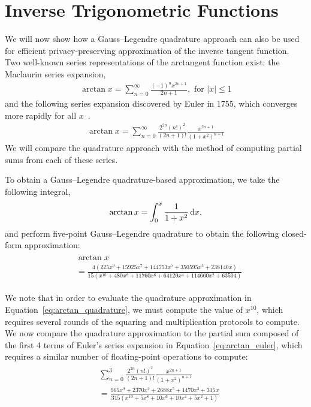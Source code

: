 \section{Inverse Trigonometric Functions}
We will now show how a Gauss--Legendre quadrature approach can also be used for efficient privacy-preserving approximation of the inverse tangent function. Two well-known series representations of the arctangent function exist: the Maclaurin series expansion,
\begin{align} \label{eq:arctan_maclaurin}
	\arctan x = \sum_{n=0}^{\infty}{\frac{(-1)^nx^{2n+1}}{2n+1}}, \text{ for }|x|\leq 1
\end{align}
and the following series expansion discovered by Euler in 1755, which converges more rapidly for all $x$~\cite{chien-lih_89.67_2005}.
\begin{align} \label{eq:arctan_euler}
	\arctan x = \sum_{n=0}^{\infty}
	{
	\frac
		{2^{2n}(n!)^2}
		{(2n+1)!}
	\frac
		{x^{2n+1}}
		{(1+x^2)^{n+1}}
	}
\end{align}
We will compare the quadrature approach with the method of computing partial sums from each of these series.

To obtain a Gauss--Legendre quadrature-based approximation, we take the following integral,
\begin{align*}
	\arctan x = \int_0^x{\frac{1}{1+x^2}\mathop{}\!\mathrm{d} x},
\end{align*}
and perform five-point Gauss--Legendre quadrature to obtain the following closed-form approximation:
\begin{align} \label{eq:arctan_quadrature}
	\begin{split}
		&\arctan x \\
		&= \frac
		{4\left(225x^9 + 15925x^7 + 144753x^5 + 350595x^3 + 238140x\right)}
		{15\left(x^{10} + 480x^8 + 11760x^6 + 64120x^4 + 114660x^2 + 63504\right)}
	\end{split}
\end{align}

We note that in order to evaluate the quadrature approximation in Equation~\ref{eq:arctan_quadrature}, we must compute the value of $x^{10}$, which requires several rounds of the squaring and multiplication protocols to compute. We now compare the quadrature approximation to the partial sum composed of the first 4 terms of Euler's series expansion in Equation~\ref{eq:arctan_euler}, which requires a similar number of floating-point operations to compute:
\begin{align} \label{eq:arctan_euler_partial}
	\begin{split}
		&\sum_{n=0}^{3}
		{
		\frac
			{2^{2n}(n!)^2}
			{(2n+1)!}
		\frac
			{x^{2n+1}}
			{(1+x^2)^{n+1}}
		}\\
		&= \frac
		{965x^9 + 2370x^7 + 2688x^5 + 1470x^3 + 315x}
		{315\left(x^{10} + 5x^8 + 10x^6 + 10x^4 + 5x^2 + 1\right)}
	\end{split}
\end{align}

